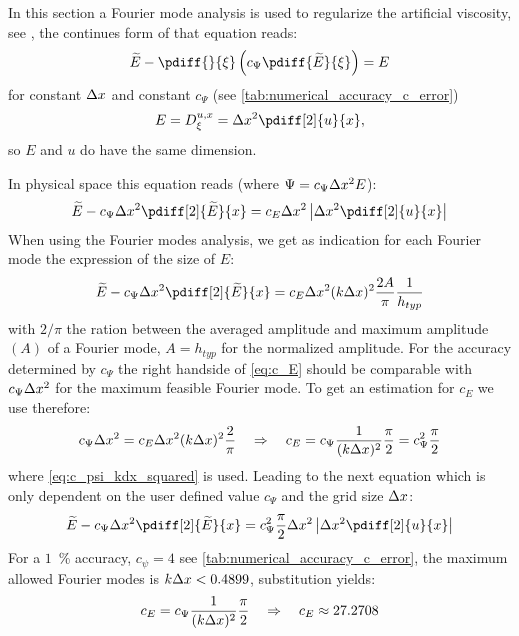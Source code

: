 In this section a Fourier mode analysis is used
to regularize the artificial viscosity, see
\citet[eq.\ 8]{Borsboom1998}, the continues form of that equation reads:
\begin{align}
\widetilde{E} - \pdiff{}{\xi}\left(c_\Psi \pdiff{\widetilde{E}}{\xi}\right)
= E
\end{align}
for constant $\Delta x$ and constant $c_\Psi$ (see \autoref{tab:numerical_accuracy_c_error})
\begin{align}
    E = D^{u,x}_{\xi} = \Dx^2 \pdiff[2]{u}{x},
\end{align}
so $E$ and $u$ do have the same dimension.

In physical space this equation reads (where $\Psi = c_\Psi \Delta x^2 E$):
\begin{align}
    \widetilde{E} - c_\Psi \Dx^2 \pdiff[2]{\widetilde{E}}{x}
    = c_E \Dx^2 \abs{ \Dx^2 \pdiff[2]{u}{x} }
\end{align}
When using the Fourier modes analysis, we get as indication for each Fourier mode  the expression of the size of  $E$:
%
\begin{align}
    \widetilde{E} - c_\Psi \Dx^2 \pdiff[2]{\widetilde{E}}{x}
    = c_{E}  \Dx^2  (k\Dx)^2 \frac{2A}{\pi}\frac{1}{h_{typ}}
    \label{eq:c_E}
\end{align}
with ${2/\pi}$ the ration between the averaged amplitude and maximum amplitude $(A)$ of a Fourier mode, $A=h_{typ}$ for the normalized amplitude.
For the accuracy determined by $c_\Psi$ the right handside of \autoref{eq:c_E} should be comparable with $c_\Psi \Delta x^2$ for the maximum feasible Fourier mode.
To get an estimation for $c_E$ we use therefore:
\begin{align}
    c_\Psi \Delta x^2  =  c_{E}  \Delta x^2  (k\Delta x)^2 \frac{2}{\pi}
    \quad \Rightarrow \quad
    c_{E} = c_\Psi \frac{1}{(k\Delta x)^2}\frac{\pi}{2} = c_\Psi^2 \frac{\pi}{2}
\end{align}
where \autoref{eq:c_psi_kdx_squared} is used.
Leading to the next equation which is only dependent on the user defined value $c_\Psi$ and the grid size $\Delta x$:
\begin{align}
    \widetilde{E} - c_\Psi \Dx^2 \pdiff[2]{\widetilde{E}}{x}
    =  c_\Psi^2 \frac{\pi}{2} \Dx^2 \abs{ \Dx^2 \pdiff[2]{u}{x} }
    \label{eq:E}
\end{align}
%
For a $1$~\% accuracy, $c_\psi = 4$ see \autoref{tab:numerical_accuracy_c_error}, the maximum allowed Fourier modes is $k\Delta x < 0.4899$, substitution yields:
\begin{align}
    c_E = c_\Psi \frac{1}{(k\Delta x)^2}\frac{\pi}{2}
    \quad \Rightarrow \quad
    c_{E} \approx 27.2708
\end{align}
